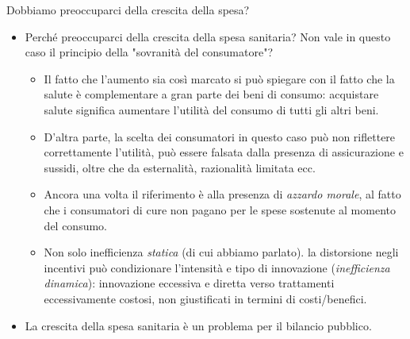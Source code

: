 \documentclass[aspectratio=149,11pt]{beamer}
\begin{document}
\begin{frame}{Dobbiamo preoccuparci della crescita della spesa?}
\begin{itemize}
\item Perché preoccuparci della crescita della spesa sanitaria? Non vale in
questo caso il principio della "sovranità del consumatore"?
\begin{itemize}
\item Il fatto che l'aumento sia così marcato si può spiegare con il fatto che la
salute è complementare a gran parte dei beni di consumo: acquistare salute
significa aumentare l'utilità del consumo di tutti gli altri beni.
\item D'altra parte, la scelta dei consumatori in questo caso può non
riflettere correttamente l'utilità, può essere falsata dalla presenza di
assicurazione e sussidi, oltre che da esternalità, razionalità limitata
ecc.
\item Ancora una volta il riferimento è alla presenza di \emph{azzardo morale}, al
fatto che i consumatori di cure non pagano per le spese sostenute al
momento del consumo.
\item Non solo inefficienza \emph{statica} (di cui abbiamo parlato). la distorsione
negli incentivi può condizionare l'intensità e tipo di innovazione
(\emph{inefficienza dinamica}): innovazione eccessiva e diretta verso trattamenti
eccessivamente costosi, non giustificati in termini di costi/benefici.
\end{itemize}
\item La crescita della spesa sanitaria è un problema per il bilancio pubblico.
\end{itemize}
\end{frame}
\end{document}
